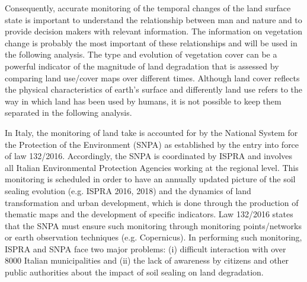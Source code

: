 \documentclass[APA,LATO1COL,doublespace]{WileyNJD-v2}
\newcommand{\toberevised}[1]{\emph{\textcolor{red}{#1}}} %
\newcommand{\update}[1]{\emph{\textcolor{blue}{#1}}}     %
\begin{document}
Consequently, accurate monitoring of the temporal changes of the land surface state is important to understand the relationship between man and nature and to provide decision makers with relevant information.
The information on vegetation change is probably the most important of these relationships and will be used in the following analysis.
The type and evolution of vegetation cover can be a powerful indicator of the magnitude of land degradation that is assessed by comparing land use/cover maps over different times.
Although land cover reflects the physical characteristics of earth's surface and differently land use refers to the way in which land has been used by humans, it is not possible to keep them separated in the following analysis.

In Italy, the monitoring of land take is accounted for by the National System for the Protection of the Environment (SNPA) as established by the entry into force of law 132/2016.
Accordingly, the SNPA is coordinated by ISPRA and involves all Italian Environmental Protection Agencies working at the regional level. 
This monitoring is scheduled in order to have an annually updated picture of the soil sealing evolution (e.g. ISPRA 2016, 2018) and the dynamics of land transformation and urban development, which is done through the production of thematic maps and the development of specific indicators. 
Law 132/2016 states that the SNPA must ensure such monitoring through monitoring points/networks or earth observation techniques (e.g. Copernicus).
In performing such monitoring, ISPRA and SNPA face two major problems: (i) difficult interaction with over 8000 Italian municipalities and (ii) the lack of awareness by citizens and other public authorities about the impact of soil sealing on land degradation.

\end{document}
